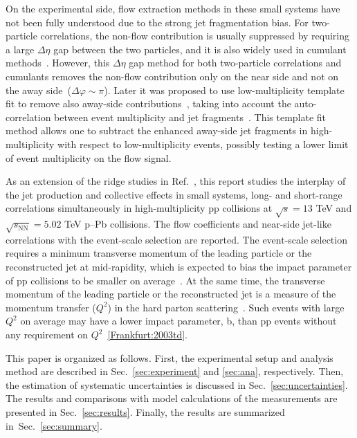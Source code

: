 On the experimental side, flow extraction methods in these small systems have not been fully understood due to the strong jet fragmentation bias. 
For two-particle correlations, the non-flow contribution is usually suppressed by requiring a large $\Delta\eta$ gap between the two particles,  and it is also widely used in cumulant methods~\cite{Bilandzic:2010jr, Acharya:2019vdf}. However, this $\Delta\eta$ gap method for both two-particle correlations and cumulants removes the non-flow contribution only on the near side and not on the away side~($\Delta\varphi\sim\pi$). Later it was proposed to use low-multiplicity template fit to remove also away-side contributions~\cite{ATLAS:2015hzw,ATLAS:2016yzd,ATLAS:2018ngv}, taking into account the auto-correlation between event multiplicity and jet fragments~\cite{CMS:2013ycn}. This template fit method allows one to subtract the enhanced away-side jet fragments in high-multiplicity with respect to low-multiplicity events, possibly testing a lower limit of event multiplicity on the flow signal.

As an extension of the ridge studies in Ref.~\cite{ALICE:2021nir}, this report studies the interplay of the jet production and collective effects in small systems, long- and short-range correlations simultaneously in high-multiplicity pp collisions at $\sqrt{s} =13$ TeV and $\sqrt{s_{\mathrm{NN}}}=5.02$ TeV p--Pb collisions. The flow coefficients and near-side jet-like correlations with the event-scale selection are reported. The event-scale selection requires a minimum transverse momentum of the leading particle or the reconstructed jet at mid-rapidity, which is expected to bias the impact parameter of pp collisions to be smaller on average~\cite{Sjostrand:1986ep,Frankfurt:2003td,Frankfurt:2010ea}. At the same time, the transverse momentum of the leading particle or the reconstructed jet is a measure of the momentum transfer ($Q^2$) in the hard parton scattering~\cite{Chatrchyan:2012tt,Chatrchyan:2011id}. Such events with large $Q^2$ on average may have a lower impact parameter, b, than pp events without any requirement on $Q^2$~\ref{Frankfurt:2003td}.

This paper is organized as follows. First, the experimental setup and analysis method are described in Sec.~\ref{sec:experiment} and \ref{sec:ana}, respectively. Then, the estimation of systematic uncertainties is discussed in Sec.~\ref{sec:uncertainties}. The results and comparisons with model calculations of the measurements are presented in Sec.~\ref{sec:results}. Finally, the results are summarized in~Sec.~\ref{sec:summary}.

 